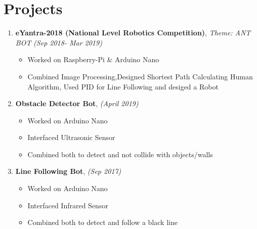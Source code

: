 \documentclass[11pt,a4paper,sans]{moderncv}   %
\begin{document}

\section{Projects}

\begin{enumerate}
	
	\item \textbf{eYantra-2018 (National Level Robotics Competition)}, \newline\textit{Theme: ANT BOT} \textit{ (Sep 2018- Mar 2019) }
	\begin{itemize}
		\item Worked on Raspberry-Pi \& Arduino Nano
		\item Combined Image Processing,Designed Shortest Path Calculating Human Algorithm, Used PID for Line Following and desiged a Robot 
		\newline
	\end{itemize}
	
	\item \textbf{Obstacle Detector Bot},     \textit{ (April 2019) }
	\begin{itemize}
		\item Worked on Arduino Nano
		\item Interfaced Ultrasonic Sensor
		\item Combined both to detect and not collide with objects/walls
		\newline
	\end{itemize}
	
	\item \textbf{Line Following Bot},     \textit{ (Sep 2017) }
\begin{itemize}
	\item Worked on Arduino Nano
	\item Interfaced Infrared Sensor
	\item Combined both to detect and follow a black line

\end{itemize}
\end{enumerate} 

\end{document}
